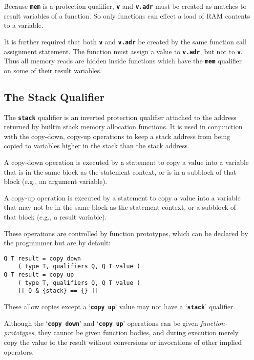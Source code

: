 \documentclass[12pt]{article}
\makeatletter
\newcommand{\TT}[1]{{\tt \bfseries #1}}
\newcommand{\ttkey}[1]{\TT{#1}\index{#1@{\tt #1}}}
\newenvironment{indpar}[1][0.3in]%
	{\begin{list}{}%
		     {\setlength{\itemsep}{0in}%
		      \setlength{\topsep}{0in}%
		      \setlength{\parsep}{1ex}%
		      \setlength{\labelwidth}{#1}%
		      \setlength{\leftmargin}{#1}%
		      \addtolength{\leftmargin}{\labelsep}}%
	 \item}%
	{\end{list}}
\makeatother
\begin{document}
Because \TT{mem} is a protection qualifier, \TT{v} and \TT{v.adr}
must be created as matches to result variables of a function.
So only functions can effect a load of RAM contents to a variable.

It is further required that both \TT{v} and \TT{v.adr} be created
by the same function call assignment statement.
The function must assign a value to
\TT{v.adr}, but not to \TT{v}.  Thus all memory reads are hidden
inside functions which have the \TT{mem} qualifier on some of
their result variables.


\subsection{The Stack Qualifier}
\label{THE-STACK-QUALIFIER}

The \ttkey{stack} qualifier is an inverted protection qualifier
attached to the address returned by builtin stack memory
allocation functions.  It is used in conjunction with the 
copy-down, copy-up operations
to keep a stack address from being copied to variables higher
in the stack than the stack address.

A copy-down operation is executed by a statement to copy
a value into a variable that is in the same block as the
statement context, or is in a subblock of that block
(e.g., an argument variable).

A copy-up operation is executed by a statement to copy
a value into a variable that may not be in the same block
as the statement context, or a subblock of that block
(e.g., a result variable).

These operations are controlled by function prototypes,
which can be declared by the programmer but are by default:

\begin{indpar}\begin{verbatim}
Q T result = copy down
    ( type T, qualifiers Q, Q T value )
Q T result = copy up
    ( type T, qualifiers Q, Q T value )
    [[ Q & {stack} == {} ]]
\end{verbatim}\end{indpar}

These allow copies except a `\TT{copy up}' value may
\underline{not} have a `\TT{stack}' qualifier.

Although the `\TT{copy down}' and `\TT{copy up}' operations
can be given {\em function-prototypes}, they cannot be given
function bodies, and during execution merely copy the value to
the result without conversions or invocations of other implied
operators.
\end{document}
